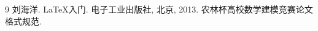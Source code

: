 
\begin{thebibliography}{9}
    刘海洋.
    \newblock \LaTeX {}入门\allowbreak[J].
    \newblock 电子工业出版社, 北京, 2013.
    农林杯高校数学建模竞赛论文格式规范.
\end{thebibliography}
